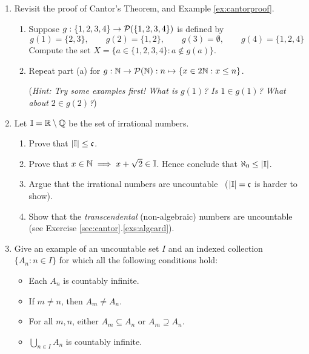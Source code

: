 \begin{exercises}{}{}
\begin{enumerate}
  
	  \item Revisit the proof of Cantor's Theorem, and Example \ref{ex:cantorproof}.
	  \begin{enumerate}
	    \item Suppose $g:\{1,2,3,4\}\to\mathcal{P}(\{1,2,3,4\})$ is defined by
	  	\[
	  		g(1)=\{2,3\},\qquad g(2)=\{1,2\},\qquad g(3)=\emptyset,\qquad g(4)=\{1,2,4\}\]
	  	Compute the set $X=\bigl\{a\in\{1,2,3,4\}:a\not\in g(a)\bigr\}$.
	  	\item Repeat part (a) for $g:\mathbb{N}\to\mathcal{P}(\mathbb{N}):n\mapsto\{x\in 2\mathbb{N}:x\le n\}$.\par
	  	(\emph{Hint: Try some examples first! What is $g(1)$? Is $1\in g(1)$? What about $2\in g(2)$?})
	  \end{enumerate}
  
  
	  \item Let $\mathbb I=\mathbb{R}\setminus\mathbb{Q}$ be the set of irrational numbers.
		\begin{enumerate}
		  \item Prove that $\left| \mathbb I\right|\le\mathfrak{c}$.
		  \item Prove that $x\in\mathbb{N}\implies x+\sqrt 2\in\mathbb I$. Hence conclude that $\aleph_0\le\left| \mathbb I\right|$.
		  \item Argue that the irrational numbers are uncountable \ ($\left| \mathbb{I}\right|=\mathfrak{c}$ is harder to show).
		  \item Show that the \emph{transcendental} (non-algebraic) numbers are uncountable (see Exercise \ref*{sec:cantor}.\ref{exs:algcard}).
	 	\end{enumerate}
 	
 	
  	\item Give an example of an uncountable set $I$ and an indexed collection $\{A_n:n\in I\}$ for which all the following conditions hold:
		\begin{itemize}
		  \item Each $A_n$ is countably infinite.
    	\item If $m \neq n$, then $A_m \neq A_n$.
    	\item For all $m,n$, either $A_m \subseteq A_n$ or $A_m \supseteq A_n$.
    	\item $\bigcup_{n \in I} A_n$ is countably infinite.
		\end{itemize}
 	

\end{enumerate}
\end{exercises}
